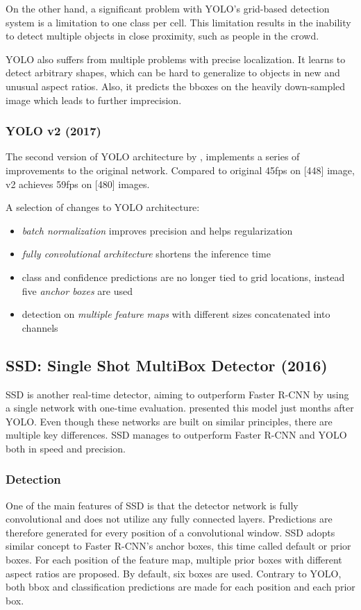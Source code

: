 On the other hand, a significant problem with YOLO's grid-based detection system is a limitation to one class per cell. This limitation results in the inability to detect multiple objects in close proximity, such as people in the crowd. 

YOLO also suffers from multiple problems with precise localization. It learns to detect arbitrary shapes, which can be hard to generalize to objects in new and unusual aspect ratios. Also, it predicts the bboxes on the heavily down-sampled image which leads to further imprecision. 

\subsubsection{YOLO v2 (2017)}
The second version of YOLO architecture by \citeauthor{bib:yolo9000} \cite{bib:yolo9000}, implements a series of improvements to the original network. Compared to original 45fps on [448] image, v2 achieves 59fps on [480] images. 

A selection of changes to YOLO architecture:
\begin{itemize}
    \item \textit{batch normalization} improves precision and helps regularization
    \item \textit{fully convolutional architecture} shortens the inference time
    \item class and confidence predictions are no longer tied to grid locations, instead five \textit{anchor boxes} are used
    \item detection on \textit{multiple feature maps} with different sizes concatenated into channels
    
\end{itemize}


\subsection{SSD: Single Shot MultiBox Detector (2016)}
\label{sec:ssd}
SSD is another real-time detector, aiming to outperform Faster R-CNN by using a single network with one-time evaluation. \citeauthor{bib:ssd} \cite{bib:ssd} presented this model just months after YOLO. Even though these networks are built on similar principles, there are multiple key differences. SSD manages to outperform Faster R-CNN and YOLO both in speed and precision.

\subsubsection{Detection}
One of the main features of SSD is that the detector network is fully convolutional and does not utilize any fully connected layers. Predictions are therefore generated for every position of a convolutional window. SSD adopts similar concept to Faster R-CNN's anchor boxes, this time called default or prior boxes. For each position of the feature map, multiple prior boxes with different aspect ratios are proposed. By default, six boxes are used. Contrary to YOLO, both bbox and classification predictions are made for each position and each prior box.

